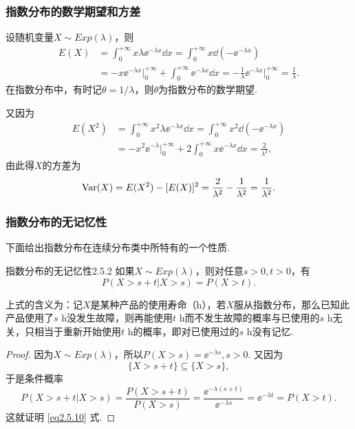 \subsubsection{指数分布的数学期望和方差}
设随机变量$X\sim Exp(\lambda)$，则
\begin{align*}
  E(X) & = \int_0^{+\infty}x\lambda \ee^{-\lambda x}\dd x = \int_0^{+\infty}x \dd (-\ee^{-\lambda x}) \\
  & = -x\ee^{-\lambda x}\big|_0^{+\infty} + \int_0^{+\infty}\ee^{-\lambda x}\dd x = - \frac1\lambda \ee^{-\lambda x}\bigg|_0^{+\infty} = \frac1\lambda .
\end{align*}
在指数分布中，有时记$\theta=1/\lambda$，则$\theta$为指数分布的数学期望.

又因为
\begin{align*}
  E(X^2) & = \int_0^{+\infty}x^2\lambda \ee^{-\lambda x}\dd x = \int_0^{+\infty}x^2\dd(-\ee^{-\lambda x}) \\
  & = -x^2\ee^{-\lambda}\bigg|_0^{+\infty}  +
    2\int_0^{+\infty} x\ee^{-\lambda x} \dd x = \frac2{\lambda^2},
\end{align*}
由此得$X$的方差为
\[
  \operatorname{Var}(X) = E(X^2) - [E(X)]^2 = \frac2{\lambda^2} - \frac1{\lambda^2} = \frac1{\lambda^2}.
\]

\subsubsection{指数分布的无记忆性}
下面给出指数分布在连续分布类中所特有的一个性质.
\begin{theorem}{指数分布的无记忆性}{2.5.2}
  如果$X\sim Exp(\lambda)$，则对任意$s>0,t>0$，有
  \begin{equation}\label{eq2.5.10}
    P(X > s + t| X > s) = P( X > t).
  \end{equation}
\end{theorem}

上式的含义为：记$X$是某种产品的使用寿命（h），若$X$服从指数分布，那么已知此产品使用了$s$ h没发生故障，则再能使用$t$ h而不发生故障的概率与已使用的$s$ h无关，只相当于重新开始使用$t$ h的概率，即对已使用过的$s$ h没有记忆.

\begin{proof}
  因为$X\sim Exp(\lambda)$，所以$P(X>s)=\ee^{-\lambda s},s>0$. 又因为
  \[
    \{X>s+t\} \subseteq \{ X>s \},
  \]
  于是条件概率
  \[
    P(X>s+t | X>s) = \frac{P(X>s+t)}{P(X>s)} = \frac{\ee^{-\lambda(s+t)}}{\ee^{-\lambda s}} = \ee^{-\lambda t} =P(X>t).
  \]
  这就证明 \eqref{eq2.5.10} 式.
\end{proof}

